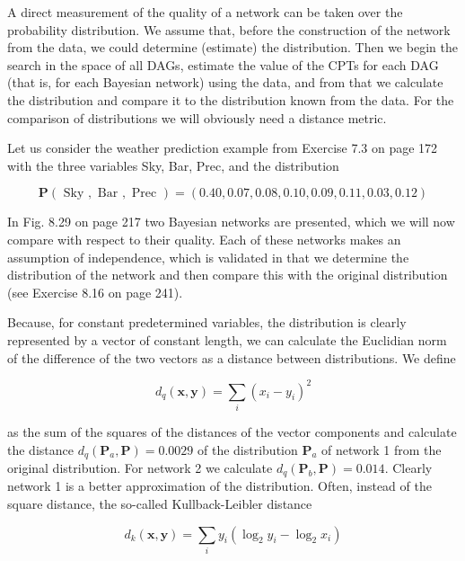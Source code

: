 \documentclass[10pt]{book}
\begin{document}
\begin{center}
\begin{enumerate}
\begin{center}
\begin{center}
A direct measurement of the quality of a network can be taken over the probability distribution. We assume that, before the construction of the network from the data, we could determine (estimate) the distribution. Then we begin the search in the space of all DAGs, estimate the value of the CPTs for each DAG (that is, for each Bayesian network) using the data, and from that we calculate the distribution and compare it to the distribution known from the data. For the comparison of distributions we will obviously need a distance metric.

Let us consider the weather prediction example from Exercise 7.3 on page 172 with the three variables Sky, Bar, Prec, and the distribution

$$
\boldsymbol{P}(\text { Sky }, \text { Bar }, \text { Prec })=(0.40,0.07,0.08,0.10,0.09,0.11,0.03,0.12)
$$

In Fig. 8.29 on page 217 two Bayesian networks are presented, which we will now compare with respect to their quality. Each of these networks makes an assumption of independence, which is validated in that we determine the distribution of the network and then compare this with the original distribution (see Exercise 8.16 on page 241).

Because, for constant predetermined variables, the distribution is clearly represented by a vector of constant length, we can calculate the Euclidian norm of the difference of the two vectors as a distance between distributions. We define

$$
d_{q}(\boldsymbol{x}, \boldsymbol{y})=\sum_{i}\left(x_{i}-y_{i}\right)^{2}
$$

as the sum of the squares of the distances of the vector components and calculate the distance $d_{q}\left(\boldsymbol{P}_{a}, \boldsymbol{P}\right)=0.0029$ of the distribution $\boldsymbol{P}_{a}$ of network 1 from the original distribution. For network 2 we calculate $d_{q}\left(\boldsymbol{P}_{b}, \boldsymbol{P}\right)=0.014$. Clearly network 1 is a better approximation of the distribution. Often, instead of the square distance, the so-called Kullback-Leibler distance

$$
d_{k}(\boldsymbol{x}, \boldsymbol{y})=\sum_{i} y_{i}\left(\log _{2} y_{i}-\log _{2} x_{i}\right)
$$


\end{center}
\end{center}
\end{enumerate}
\end{center}
\end{document}
